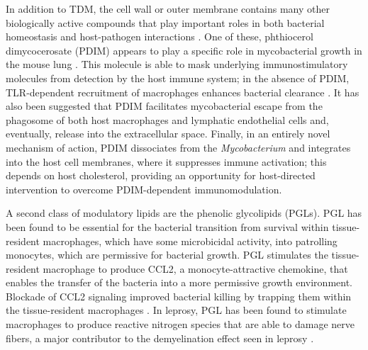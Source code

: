 In addition to TDM, the cell wall or outer membrane contains many other biologically active compounds that play important roles in both bacterial homeostasis and host-pathogen interactions \citep{Yu2012}. One of these, phthiocerol dimycocerosate (PDIM) appears to play a specific role in mycobacterial growth in the mouse lung \citep{Cox1999}. This molecule is able to mask underlying immunostimulatory molecules from detection by the host immune system; in the absence of PDIM, TLR-dependent recruitment of macrophages enhances bacterial clearance \citep{Cambier2014b, Day2014}. It has also been suggested that PDIM facilitates mycobacterial escape from the phagosome of both host macrophages and lymphatic endothelial cells and, eventually, release into the extracellular space\citep{Quigley2017, Lerner2018}. Finally, in an entirely novel mechanism of action, PDIM dissociates from the \textit{Mycobacterium} and integrates into the host cell membranes, where it suppresses immune activation; this depends on host cholesterol, providing an opportunity for host-directed intervention to overcome PDIM-dependent immunomodulation.

A second class of modulatory lipids are the phenolic glycolipids (PGLs). PGL has been found to be essential for the bacterial transition from survival within tissue-resident macrophages, which have some microbicidal activity, into patrolling monocytes, which are permissive for bacterial growth. PGL stimulates the tissue-resident macrophage to produce CCL2, a monocyte-attractive chemokine, that enables the transfer of the bacteria into a more permissive growth environment. Blockade of CCL2 signaling improved bacterial killing by trapping them within the tissue-resident macrophages \citep{Cambier2014b, Cambier2017}. In leprosy, PGL has been found to stimulate macrophages to produce reactive nitrogen species that are able to damage nerve fibers, a major contributor to the demyelination effect seen in leprosy \citep{Madigan2017}.


